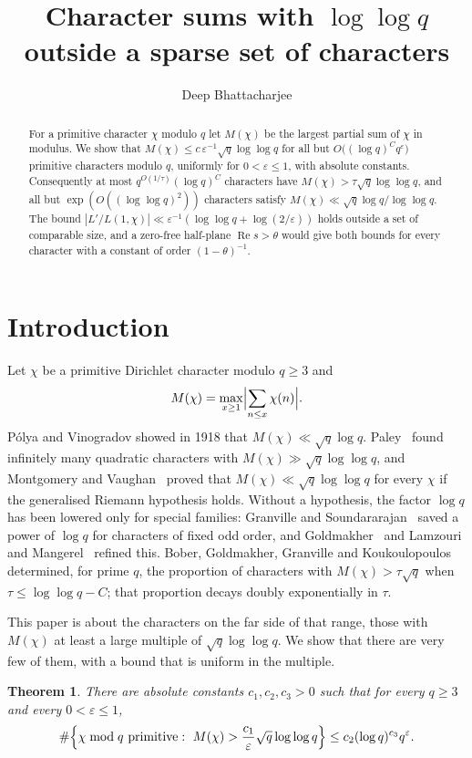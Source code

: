 \documentclass[11pt,a4paper,reqno]{amsart}
\title[Character sums outside a sparse set]{Character sums with $\log\log q$ outside a sparse set of characters}
\author{Deep Bhattacharjee}
\date{}
\newtheorem{theorem}{Theorem}[section]
\theoremstyle{remark}
\numberwithin{equation}{section}
\renewcommand{\Re}{\operatorname{Re}}
\newcommand{\eps}{\varepsilon}
\begin{document}
\begin{abstract}
For a primitive character $\chi$ modulo $q$ let $M(\chi)$ be the largest partial sum of $\chi$ in modulus. We show that $M(\chi)\le c\,\eps^{-1}\sqrt q\log\log q$ for all but $O\bigl((\log q)^{C}q^{\eps}\bigr)$ primitive characters modulo $q$, uniformly for $0<\eps\le1$, with absolute constants. Consequently at most $q^{O(1/\tau)}(\log q)^{C}$ characters have $M(\chi)>\tau\sqrt q\log\log q$, and all but $\exp(O((\log\log q)^2))$ characters satisfy $M(\chi)\ll\sqrt q\log q/\log\log q$. The bound $|L'/L(1,\chi)|\ll\eps^{-1}(\log\log q+\log(2/\eps))$ holds outside a set of comparable size, and a zero-free half-plane $\Re s>\theta$ would give both bounds for every character with a constant of order $(1-\theta)^{-1}$.
\end{abstract}

\maketitle
\section{Introduction}

Let $\chi$ be a primitive Dirichlet character modulo $q\ge3$ and
\[
  M(\chi)=\max_{x\ge1}\Bigl|\sum_{n\le x}\chi(n)\Bigr|.
\]
P\'olya and Vinogradov showed in 1918 that $M(\chi)\ll\sqrt q\log q$. Paley~\cite{Pal32} found infinitely many quadratic characters with $M(\chi)\gg\sqrt q\log\log q$, and Montgomery and Vaughan~\cite{MV77} proved that $M(\chi)\ll\sqrt q\log\log q$ for every $\chi$ if the generalised Riemann hypothesis holds. Without a hypothesis, the factor $\log q$ has been lowered only for special families: Granville and Soundararajan~\cite{GS07} saved a power of $\log q$ for characters of fixed odd order, and Goldmakher~\cite{Gol12} and Lamzouri and Mangerel~\cite{LM22} refined this. Bober, Goldmakher, Granville and Koukoulopoulos~\cite{BGGK18} determined, for prime $q$, the proportion of characters with $M(\chi)>\tau\sqrt q$ when $\tau\le\log\log q-C$; that proportion decays doubly exponentially in $\tau$.

This paper is about the characters on the far side of that range, those with $M(\chi)$ at least a large multiple of $\sqrt q\log\log q$. We show that there are very few of them, with a bound that is uniform in the multiple.

\begin{theorem}\label{thm:A}
There are absolute constants $c_1,c_2,c_3>0$ such that for every $q\ge3$ and every $0<\eps\le1$,
\[
  \#\Bigl\{\chi\bmod q\ \text{primitive}:\ M(\chi)>\frac{c_1}{\eps}\sqrt q\log\log q\Bigr\}\le c_2(\log q)^{c_3}q^{\eps}.
\]
\end{theorem}
\end{document}

